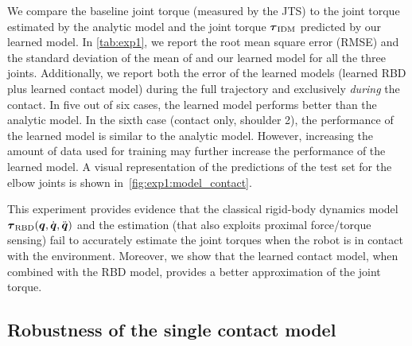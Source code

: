    
	We compare the baseline joint torque (measured by the JTS) to the joint torque estimated by the analytic model \idyn{} and  the joint torque $\boldsymbol{\tau}_\text{IDM}$ predicted by our learned model.
	In \tab\ref{tab:exp1}, we report the root mean square error (RMSE) and the standard deviation of the mean of \idyn{} and our learned model for all the three joints.
	Additionally, we report both the error of the learned models (learned RBD plus learned contact model) during the full trajectory and exclusively \textit{during} the contact. 
	In five out of six cases, the learned model performs better than the analytic model. 
    In the sixth case (contact only, shoulder 2), the performance of the learned model is similar to the analytic model.
    However, increasing the amount of data used for training may further increase the performance of the learned model. 
	A visual representation of the predictions of the test set for the elbow joints is shown in~\fig\ref{fig:exp1:model_contact}.
	
    This experiment provides evidence that the classical rigid-body dynamics model $\boldsymbol{\tau}_\text{RBD}(\boldsymbol q,\dot{\boldsymbol q},\ddot{\boldsymbol q})$ and the \idyn{} estimation (that also exploits proximal force/torque sensing) fail to accurately estimate the joint torques when the robot is in contact with the environment. 
	Moreover, we show that the learned contact model, when combined with the RBD model, provides a better approximation of the joint torque.
	
\subsection{Robustness of the single contact model}
\label{sec:results:exp2}

